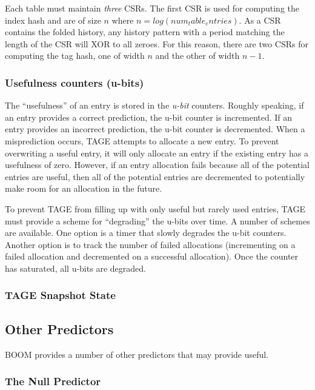 Each table must maintain {\em three} CSRs.  The first CSR is used for computing the index hash and are of size $n$ where $n=log(num_table_entries)$.  As a CSR contains the folded history, any history pattern with a period matching the length of the CSR will XOR to all zeroes.  For this reason, there are two CSRs for computing the tag hash, one of width $n$ and the other of width $n-1$. 

\subsubsection{Usefulness counters (u-bits)}

The ``usefulness'' of an entry is stored in the {\em u-bit} counters.  Roughly speaking, if an entry provides a correct prediction, the u-bit counter is incremented. If an entry provides an incorrect prediction, the u-bit counter is decremented.  When a misprediction occurs, TAGE attempts to allocate a new entry.  To prevent overwriting a useful entry, it will only allocate an entry if the existing entry has a usefulness of zero.  However, if an entry allocation fails because all of the potential entries are useful, then all of the potential entries are decremented to potentially make room for an allocation in the future.

To prevent TAGE from filling up with only useful but rarely used entries, TAGE must provide a scheme for ``degrading'' the u-bits over time.  A number of schemes are available.  One option is a timer that slowly degrades the u-bit counters.  Another option is to track the number of failed allocations (incrementing on a failed allocation and decremented on a successful allocation). Once the counter has saturated, all u-bits are degraded. 

\subsubsection{TAGE Snapshot State}




\subsection{Other Predictors}

BOOM provides a number of other predictors that may provide useful.

\subsubsection{The Null Predictor}

